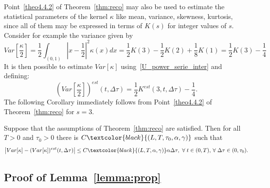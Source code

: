 \documentclass[10pt]{amsart}
\theoremstyle{definition}\newtheorem{defi}[theo]{Definition}\newtheorem{rema}[theo]{Remark}\newtheorem{exam}[theo]{Example}\newtheorem{exem}[theo]{Example}\newtheorem{nota}[theo]{Notation}
\newcommand*\dst{\displaystyle}
\newcommand{\MT}[1]{\textcolor{black}{#1}}
\let\oldforall\forall
\renewcommand*{\forall}{\mathrel{\oldforall}}
\begin{document}
Point~\eqref{theo4.4.2} of Theorem~\ref{thm:reco} may also be used to estimate the statistical parameters of the kernel $\kappa $ like mean, variance, skewness, kurtosis, since all of them may be expressed in terms of $K(s)$ for integer values of $s$. Consider for example the variance given by
\begin{equation*}
Var\left[\dfrac{\kappa}{2}\right] =\dfrac{1}{2} \dst\int_{(0,1)} \left| x-\dfrac{1}{2}\right|^2 \kappa(x)dx =\dfrac{1}{2}K(3)- \dfrac{1}{2}K(2)+ \dfrac{1}{8}K(1)=\dfrac{1}{2}K(3)- \dfrac{1}{4}
\end{equation*}
It is then possible to estimate $Var[\kappa]$ using~\ref{U_power_serie_inter} and defining:
\begin{equation*}
\left(Var\left[\dfrac{\kappa}{2}\right] \right)^{est}(t, \Delta \tau)=\dfrac{1}{2}K^{est}(3, t, \Delta \tau)- \dfrac{1}{4}.
\end{equation*}
The following Corollary immediately follows from Point~\eqref{theo4.4.2} of Theorem~\ref{thm:reco} for $s=3$.


\begin{coro}\label{cor:variance}
Suppose that the assumptions of Theorem~\ref{thm:reco} are satisfied. Then for all $T>0$ and $\tau _0>0$ there is $C\MT{(L,T, \tau _0,\alpha, \gamma)}$ such that
\begin{equation*}
\left| Var[\kappa]-(Var[\kappa])^{est}(t, \Delta \tau)\right| \leq C\MT{(L,T,\alpha, \gamma)}\alpha \Delta \tau,\,\,\forall t\in (0, T),\,\forall \Delta \tau \in (0, \tau _0).
\end{equation*}
\end{coro}


\subsection{Proof of Lemma~\ref{lemma:prop}}
\end{document}
